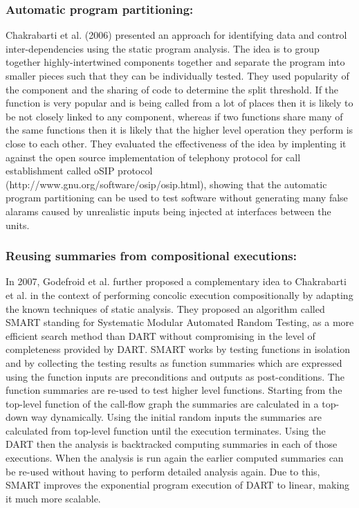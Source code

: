 \documentclass[	runningheads,
				a4paper]{llncs}
\begin{document}
\subsubsection{Automatic program partitioning:}
Chakrabarti et al. (2006) \cite{chakrabarti2006software} presented an approach for identifying data and control inter-dependencies using the static program analysis. The idea is to group together highly-intertwined components together and separate the program into smaller pieces such that they can be individually tested. They used popularity of the component and the sharing of code to determine the split threshold. If the function is very popular and is being called from a lot of places then it is likely to be not closely linked to any component, whereas if two functions share many of the same functions then it is likely that the higher level operation they perform is close to each other. They evaluated the effectiveness of the idea by implenting it against the open source implementation of telephony protocol for call establishment called oSIP protocol (http://www.gnu.org/software/osip/osip.html), showing that the automatic program partitioning can be used to test software without generating many false alarams caused by unrealistic inputs being injected at interfaces between the units.

\subsubsection{Reusing summaries from compositional executions:}
In 2007, Godefroid et al. \cite{godefroid2007compositional} further proposed a complementary idea \cite{godefroid2007compositional} to Chakrabarti et al. \cite{chakrabarti2006software} in the context of performing concolic execution compositionally by adapting the known techniques of static analysis. They proposed an algorithm called SMART standing for Systematic Modular Automated Random Testing, as a more efficient search method than DART \cite{godefroid2005dart} without compromising in the level of completeness provided by DART. SMART works by testing functions in isolation and by collecting the testing results as function summaries which are expressed using the function inputs are preconditions and outputs as post-conditions. The function summaries are re-used to test higher level functions. Starting from the top-level function of the call-flow graph the summaries are calculated in a top-down way dynamically. Using the initial random inputs the summaries are calculated from top-level function until the execution terminates. Using the DART then the analysis is backtracked computing summaries in each of those executions. When the analysis is run again the earlier computed summaries can be re-used without having to perform detailed analysis again. Due to this, SMART improves the exponential program execution of DART to linear, making it much more scalable.
\end{document}
